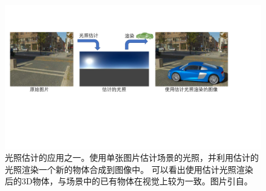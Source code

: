\begin{figure}[!htbp]
    \centering
    \includegraphics[width=1.0\textwidth]{Img/demo-problem-define.pdf}

    \caption[光照估计的应用]
    {光照估计的应用之一。使用单张图片估计场景的光照，并利用估计的光照渲染一个新的物体合成到图像中。
    可以看出使用估计光照渲染后的3D物体，与场景中的已有物体在视觉上较为一致。图片引自\cite{hold2017deep}。}
    
    \label{fig:demo-problem-define}
\end{figure}